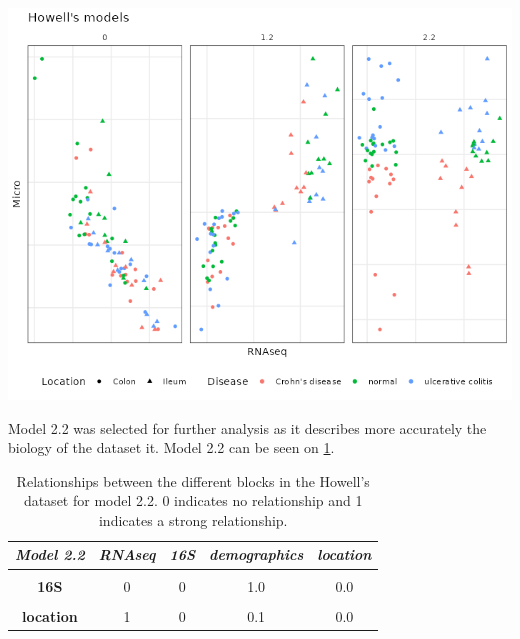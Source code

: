 \documentclass[
  12pt,
  a4paper,
  twoside,
  openright]{book}
\let\origfigure\figure
\let\endorigfigure\endfigure
\renewenvironment{figure}[1][2] {
    \expandafter\origfigure\expandafter[!htp]
} {
    \endorigfigure
}
\begin{document}
\begin{figure}
\includegraphics[width=1\linewidth]{images/howell-models} \caption[Models from inteRmodel in the Howell's datset.]{Models from inteRmodel in the Howell's datset. The three main models, model 0, 1.2 and 2.2 on the Howell's dataset colored by section colon, ileum and shape according to the disease: square, ulcerative colitis; triangle, normal; circle, Crohn's disease. Model 0 has just trancriptomic and microbiome data, model 1.2 has transcriptomic, microbiome and sample data and model 2.2 has transcriptomic, microbiome and sample data split in different blocks.}\label{fig:howell-models}
\end{figure}

Model 2.2 was selected for further analysis as it describes more accurately the biology of the dataset it.
Model 2.2 can be seen on \ref{tab:howell-model2-2}.

\begin{table}[H]

\caption[Model 2.2 of the Howell's dataset.]{\label{tab:howell-model2-2}Relationships between the different blocks in the Howell's dataset for model 2.2. 0 indicates no relationship and 1 indicates a strong relationship.}
\centering
\begin{tabular}[t]{|>{}c|c|c|c|>{}c|}
\hline
\em{\textbf{Model 2.2}} & \em{\textbf{RNAseq}} & \em{\textbf{16S}} & \em{\textbf{demographics}} & \em{\textbf{location}}\\
\hline
\textbf{\cellcolor{gray!6}{RNAseq}} & \cellcolor{gray!6}{0} & \cellcolor{gray!6}{0} & \cellcolor{gray!6}{0.0} & \cellcolor{gray!6}{1.0}\\
\hline
\textbf{16S} & 0 & 0 & 1.0 & 0.0\\
\hline
\textbf{\cellcolor{gray!6}{demographics}} & \cellcolor{gray!6}{0} & \cellcolor{gray!6}{1} & \cellcolor{gray!6}{0.0} & \cellcolor{gray!6}{0.1}\\
\hline
\textbf{location} & 1 & 0 & 0.1 & 0.0\\
\hline
\end{tabular}
\end{table}
\end{document}
